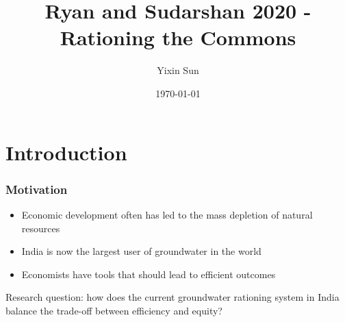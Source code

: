 \documentclass[handout,aspectratio=169]{beamer} %
\title{Ryan and Sudarshan 2020 - Rationing the Commons}
\author{Yixin Sun}
\institute{\emph{EEE Presentation}}
\date{\today}
\begin{document}
\begin{frame}
\titlepage
\end{frame}


\section{Introduction}
\begin{frame}
    \frametitle{Motivation}
    \begin{itemize}
        \item Economic development often has led to the mass depletion of natural resources  \pause 
        \item India is now the largest user of groundwater in the world \pause 
        \item Economists have tools that should lead to efficient outcomes \pause
    \end{itemize}

    Research question: how does the current groundwater rationing system in India balance the trade-off between efficiency and equity?

\end{frame}
\end{document}
